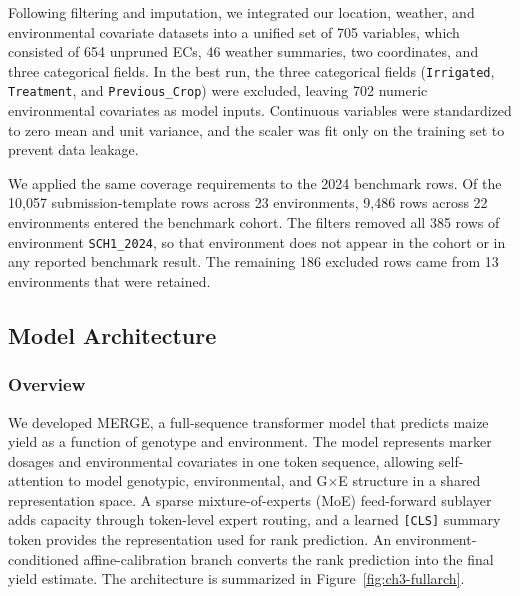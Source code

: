 Following filtering and imputation, we integrated our location, weather, and environmental covariate datasets into a unified set of 705 variables, which consisted of 654 unpruned ECs, 46 weather summaries, two coordinates, and three categorical fields. In the best run, the three categorical fields (\texttt{Irrigated}, \texttt{Treatment}, and \texttt{Previous\_Crop}) were excluded, leaving 702 numeric environmental covariates as model inputs. Continuous variables were standardized to zero mean and unit variance, and the scaler was fit only on the training set to prevent data leakage.

We applied the same coverage requirements to the 2024 benchmark rows. Of the 10,057 submission-template rows across 23 environments, 9,486 rows across 22 environments entered the benchmark cohort. The filters removed all 385 rows of environment \texttt{SCH1\_2024}, so that environment does not appear in the cohort or in any reported benchmark result. The remaining 186 excluded rows came from 13 environments that were retained.

\subsection{Model Architecture}\label{sec:ch3-architecture}
\subsubsection{Overview}
We developed MERGE, a full-sequence transformer model that predicts maize yield as a function of genotype and environment. The model represents marker dosages and environmental covariates in one token sequence, allowing self-attention to model genotypic, environmental, and G$\times$E structure in a shared representation space. A sparse mixture-of-experts (MoE) feed-forward sublayer \cite{shazeer2017outrageously} adds capacity through token-level expert routing, and a learned \texttt{[CLS]} summary token \cite{bert} provides the representation used for rank prediction. An environment-conditioned affine-calibration branch converts the rank prediction into the final yield estimate. The architecture is summarized in Figure~\ref{fig:ch3-fullarch}.

